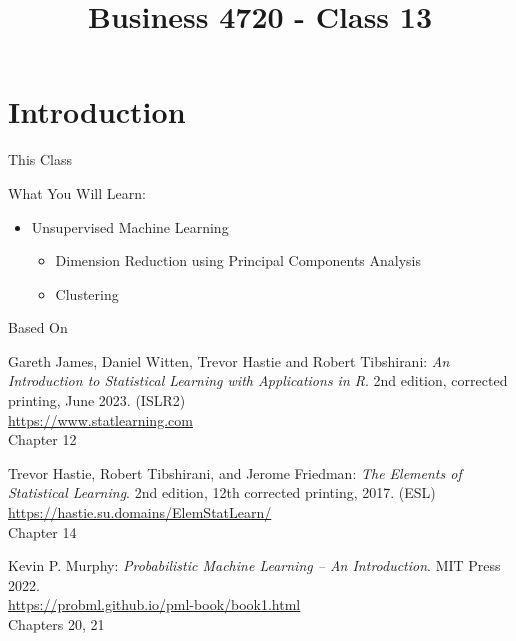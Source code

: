 \documentclass[ignorenonframetext,xcolor=x11names]{beamer}
\title{Business 4720 - Class 13}
\begin{document}
\begin{frame}{}
  \titlepage
  \footnotesize
  
\end{frame}

\section{Introduction}

\begin{frame}{This Class}

\begin{block}{What You Will Learn:}
\begin{itemize}
  \item Unsupervised Machine Learning
  \begin{itemize}
     \item Dimension Reduction using Principal Components Analysis
     \item Clustering
  \end{itemize}
\end{itemize}
\end{block}
\end{frame}

\begin{frame}{Based On}
\small
\begin{block}{}
Gareth James, Daniel Witten, Trevor Hastie and Robert Tibshirani: \emph{An Introduction to Statistical Learning with Applications in R}. 2nd edition, corrected printing, June 2023. (ISLR2) \\
\vspace{1mm}
\url{https://www.statlearning.com} \\
\vspace{1mm}
Chapter 12
\end{block}

\begin{block}{}
Trevor Hastie, Robert Tibshirani, and Jerome Friedman: \emph{The Elements of Statistical Learning}. 2nd edition, 12th corrected printing, 2017. (ESL) \\
\vspace{1mm}
\url{https://hastie.su.domains/ElemStatLearn/} \\
\vspace{1mm}
Chapter 14
\end{block}

\begin{block}{}
Kevin P. Murphy: \emph{Probabilistic Machine Learning -- An Introduction}. MIT Press 2022. \\
\vspace{1mm}
\url{https://probml.github.io/pml-book/book1.html} \\
\vspace{1mm}
Chapters 20, 21
\end{block}
\end{frame}
\end{document}
